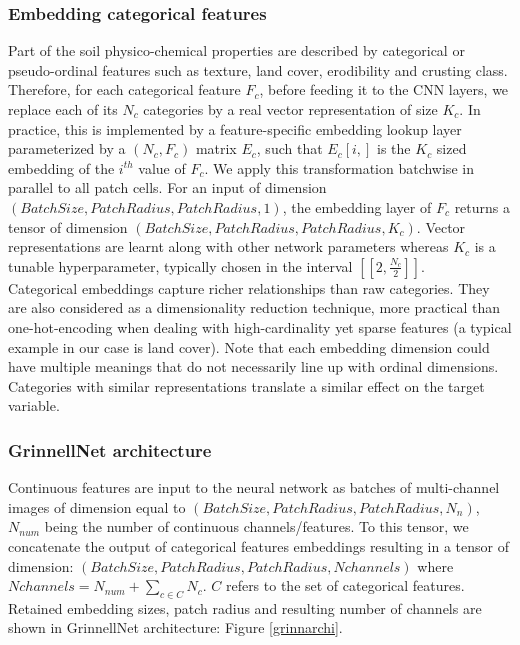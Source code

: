\documentclass[]{article}
\begin{document}
\subsubsection{Embedding categorical features}
Part of the soil physico-chemical properties are described by categorical or pseudo-ordinal features such as texture, land cover, erodibility and crusting class. Therefore, for each categorical feature $F_c$, before feeding it to the CNN layers, we replace each of its $N_c$ categories by a real vector representation of size $K_c$. In practice, this is implemented by a feature-specific embedding lookup layer parameterized by a $(N_c,F_c)$ matrix $E_c$, such that $E_c[i,]$ is the $K_c$ sized embedding of the $i^{th}$ value of $F_c$. We apply this transformation batchwise in parallel to all patch cells. For an input of dimension $(BatchSize, PatchRadius, PatchRadius, 1)$, the embedding layer of $F_c$ returns a tensor of dimension $(BatchSize, PatchRadius, PatchRadius, K_c)$. Vector representations are learnt along with other network parameters whereas $K_c$ is a tunable hyperparameter, typically chosen in the interval $[\![2,\frac{N_c}{2}]\!]$. \\

\noindent Categorical embeddings capture richer relationships than raw categories. They are also considered as a dimensionality reduction technique, more practical than one-hot-encoding when dealing with high-cardinality yet sparse features (a typical example in our case is land cover). Note that each embedding dimension could have multiple meanings that do not necessarily line up with ordinal dimensions. Categories with similar representations translate a similar effect on the target variable. 

\subsubsection{GrinnellNet architecture}
Continuous features are input to the neural network as batches of multi-channel images of dimension equal to $(BatchSize, PatchRadius, PatchRadius, N_n)$, $N_{num}$ being the number of continuous channels/features. To this tensor, we concatenate the output of categorical features embeddings resulting in a tensor of dimension:  $(BatchSize, PatchRadius, PatchRadius,Nchannels)$ where $Nchannels= N_{num} + \sum_{c \in C}{N_c}$. $C$ refers to the set of categorical features. Retained embedding sizes, patch radius and resulting number of channels are shown in GrinnellNet architecture: Figure \ref{grinnarchi}.\\
\end{document}
